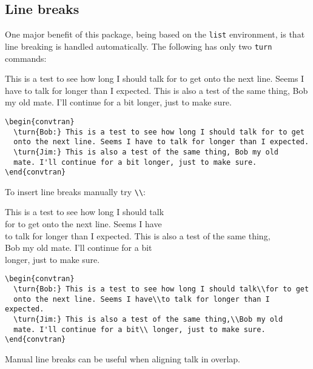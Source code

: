 \documentclass[a4paper]{article}
\begin{document}
\subsection{Line breaks}
One major benefit of this package, being based on the \verb!list!
environment, is that line breaking is handled automatically.  The
following has only two \verb!turn! commands:
\begin{convtran}
 This is a test to see how long I should talk for to get
onto the next line. Seems I have to talk for longer than I expected.
 This is also a test of the same thing, Bob my old
mate. I'll continue for a bit longer, just to make sure.
\end{convtran}
\begin{verbatim}
\begin{convtran}
  \turn{Bob:} This is a test to see how long I should talk for to get
  onto the next line. Seems I have to talk for longer than I expected.
  \turn{Jim:} This is also a test of the same thing, Bob my old
  mate. I'll continue for a bit longer, just to make sure.
\end{convtran}
\end{verbatim}

To insert line breaks manually try \verb!\\!:
\begin{convtran}
   This is a test to see how long I should talk\\for to get
  onto the next line. Seems I have\\to talk for longer than I expected.
   This is also a test of the same thing,\\Bob my old
  mate. I'll continue for a bit\\ longer, just to make sure.
\end{convtran}
\begin{verbatim}
\begin{convtran}
  \turn{Bob:} This is a test to see how long I should talk\\for to get
  onto the next line. Seems I have\\to talk for longer than I expected.
  \turn{Jim:} This is also a test of the same thing,\\Bob my old
  mate. I'll continue for a bit\\ longer, just to make sure.
\end{convtran}
\end{verbatim}
Manual line breaks can be useful when aligning talk in overlap.
\end{document}
